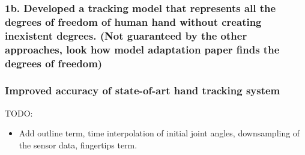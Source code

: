 \subsubsection*{1b. Developed a tracking model that represents all the degrees of freedom of human hand without creating inexistent degrees. (Not guaranteed by the other approaches, look how model adaptation paper finds the degrees of freedom)}

\subsubsection*{Improved accuracy of state-of-art hand tracking system}

TODO: 

\begin{itemize}
\item Add outline term, time interpolation of initial joint angles, downsampling of the sensor data, fingertips term.
\end{itemize}